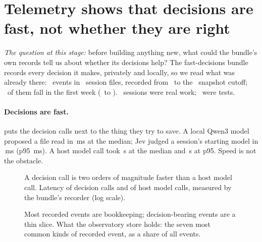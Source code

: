 \section{Telemetry shows that decisions are fast, not whether they are right}\label{sec:observatory}

\emph{The question at this stage:} before building anything new, what could the bundle's own records tell us about
whether its decisions help? The fast-decisions bundle records every decision it makes, privately and locally, so we
read what was already there: \ObEvents\ events in \ObSessionFiles\ session files, recorded from \ObWeekStart\ to the
\ObCutoff\ snapshot cutoff; \ObWeekEvents\ of them fall in the first week (\ObWeekStart\ to \ObWeekEnd). \ObProdSessions\ sessions were real work; \ObTestSessions\ were tests.

\paragraph{Decisions are fast.}  puts the decision calls next to the thing they try to save.
A local Qwen3 model proposed a file read in \ObQwenPfifty\,ms at the median; Jev judged a session's starting model in
\ObJevPfifty\,ms (p95 \ObJevPninetyfive\,ms). A host model call took \ObHostPfifty\,s at the median and \ObHostPninetyfive\,s
at p95. Speed is not the obstacle.

\begin{figure}[htbp]
\centering
{}\par\smallskip

\caption{A decision call is two orders of magnitude faster than a host model call. Latency of decision calls and of host model calls, measured by the bundle's recorder (log scale).}
\label{fig:obslatency}
\end{figure}

\begin{figure}[htbp]
\centering
{}\par\smallskip

\caption{Most recorded events are bookkeeping; decision-bearing events are a thin slice. What the observatory store holds: the seven most common kinds of recorded event, as a share of all events.}
\label{fig:obsmix}
\end{figure}

